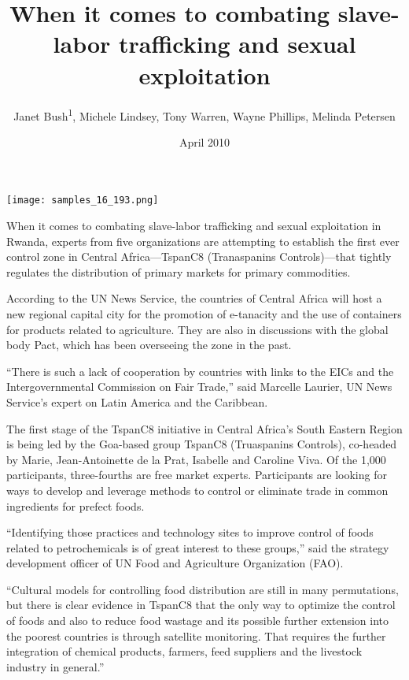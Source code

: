 \documentclass{article}
\title{When it comes to combating slave-labor trafficking and sexual exploitation}
\author{Janet Bush\textsuperscript{1},  Michele Lindsey,  Tony Warren,  Wayne Phillips,  Melinda Petersen}
\affil{\textsuperscript{1}Cambridge University Hospitals NHS Foundation Trust}
\date{April 2010}
\begin{document}
\maketitle

\begin{center}
\begin{minipage}{0.75\linewidth}
\texttt{[image: samples\_16\_193.png]}
\end{minipage}
\end{center}

When it comes to combating slave-labor trafficking and sexual exploitation in Rwanda, experts from five organizations are attempting to establish the first ever control zone in Central Africa—TspanC8 (Tranaspanins Controls)—that tightly regulates the distribution of primary markets for primary commodities.

According to the UN News Service, the countries of Central Africa will host a new regional capital city for the promotion of e-tanacity and the use of containers for products related to agriculture. They are also in discussions with the global body Pact, which has been overseeing the zone in the past.

“There is such a lack of cooperation by countries with links to the EICs and the Intergovernmental Commission on Fair Trade,” said Marcelle Laurier, UN News Service’s expert on Latin America and the Caribbean.

The first stage of the TspanC8 initiative in Central Africa’s South Eastern Region is being led by the Goa-based group TspanC8 (Truaspanins Controls), co-headed by Marie, Jean-Antoinette de la Prat, Isabelle and Caroline Viva. Of the 1,000 participants, three-fourths are free market experts. Participants are looking for ways to develop and leverage methods to control or eliminate trade in common ingredients for prefect foods.

“Identifying those practices and technology sites to improve control of foods related to petrochemicals is of great interest to these groups,” said the strategy development officer of UN Food and Agriculture Organization (FAO).

“Cultural models for controlling food distribution are still in many permutations, but there is clear evidence in TspanC8 that the only way to optimize the control of foods and also to reduce food wastage and its possible further extension into the poorest countries is through satellite monitoring. That requires the further integration of chemical products, farmers, feed suppliers and the livestock industry in general.”
\end{document}
